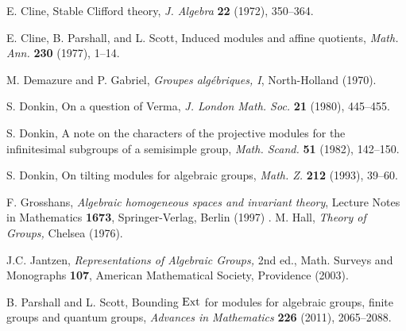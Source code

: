 \documentclass[11pt,leqno,amscd,amssymb,verbatim, url]{amsart}
\theoremstyle{definition}
\numberwithin{equation}{thm}
\newcommand{\Ext}{{\text{\rm Ext}}}
\begin{document}
 \begin{thebibliography}{W}

 E. Cline, Stable Clifford theory, {\it J. Algebra} {\bf 22} (1972), 350--364.

 E. Cline, B. Parshall, and L. Scott, Induced modules and affine quotients, {\it Math. Ann.}
{\bf 230} (1977), 1--14.

 M. Demazure and P. Gabriel, {\it Groupes alg\'ebriques, I}, North-Holland (1970).


 S. Donkin, On a question of Verma, {\it J. London Math. Soc.} {\bf 21} (1980), 445--455.

 S. Donkin, A note on the characters of the projective modules for the infinitesimal subgroups of
a semisimple group, {\it Math. Scand.} {\bf 51} (1982), 142--150.

 S. Donkin, On tilting modules for algebraic groups, {\it Math. Z.} {\bf 212} (1993), 39--60.

 F. Grosshans, {\it Algebraic homogeneous spaces and invariant theory},  Lecture Notes in Mathematics {\bf 1673}, Springer-Verlag, Berlin (1997)
.
 M. Hall, {\it Theory of Groups,} Chelsea (1976).

 J.C. Jantzen, {\it Representations of
Algebraic Groups,} 2nd ed., Math. Surveys and Monographs {\bf 107}, American Mathematical Society, Providence (2003).

 B. Parshall and L. Scott, Bounding $\Ext$ for modules for algebraic groups, finite groups and
quantum groups,  {\it Advances in Mathematics} {\bf 226} (2011), 2065--2088.

 \end{thebibliography}
\end{document}
